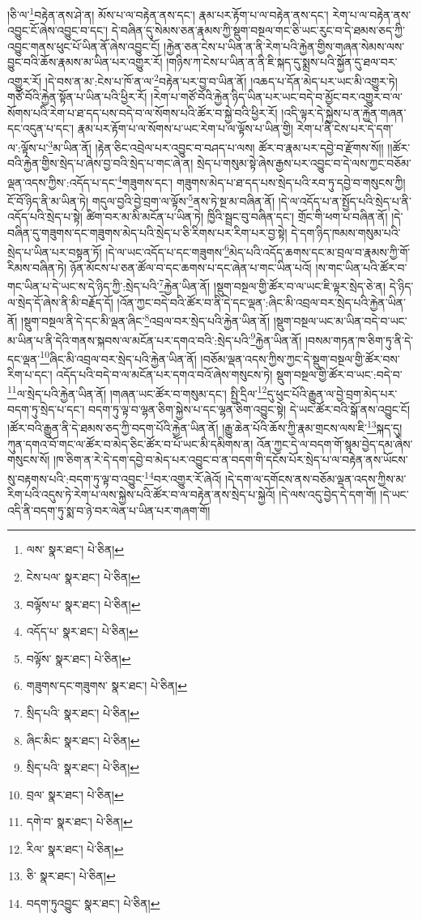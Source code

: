 །ཅི་ལ་\footnote{ལས་  སྣར་ཐང་།  པེ་ཅིན། }བརྟེན་ནས་ཤེ་ན། མོས་པ་ལ་བརྟེན་ནས་དང་། རྣམ་པར་རྟོག་པ་ལ་བརྟེན་ནས་དང་། རེག་པ་ལ་བརྟེན་ནས་འབྱུང་ངོ་ཞེས་འབྱུང་བ་དང་། དེ་བཞིན་དུ་སེམས་ཅན་རྣམས་ཀྱི་སྡུག་བསྔལ་གང་ཅི་ཡང་རུང་བ་དེ་ཐམས་ཅད་ཀྱི་འབྱུང་གནས་ཕུང་པོ་ཡིན་ནོ་ཞེས་འབྱུང་ངོ། །རྐྱེན་ཅན་ངེས་པ་ཡིན་ན་ནི་རེག་པའི་རྐྱེན་གྱིས་གཞན་སེམས་ལས་བྱུང་བའི་ཆོས་རྣམས་མ་ཡིན་པར་འགྱུར་རོ། །གཉིས་ཀ་ངེས་པ་ཡིན་ན་ནི་ཇི་སྐད་དུ་སྨྲས་པའི་སྐྱོན་དུ་ཐལ་བར་འགྱུར་རོ། །དེ་བས་ན་མ་:ངེས་པ་ཁོ་ན་ལ་\footnote{ངེས་པལ་  སྣར་ཐང་།  པེ་ཅིན། }བརྟེན་པར་བྱ་བ་ཡིན་ནོ། །འཆད་པ་དོན་མེད་པར་ཡང་མི་འགྱུར་ཏེ། གཙོ་བོའི་རྐྱེན་སྟོན་པ་ཡིན་པའི་ཕྱིར་རོ། །རེག་པ་གཙོ་བོའི་རྐྱེན་ཉིད་ཡིན་པར་ཡང་བདེ་བ་མྱོང་བར་འགྱུར་བ་ལ་སོགས་པའི་རེག་པ་ཐ་དད་པས་བདེ་བ་ལ་སོགས་པའི་ཚོར་བ་སྐྱེ་བའི་ཕྱིར་རོ། །འདི་ལྟར་དེ་སྐྱེས་པ་ན་རྐྱེན་གཞན་དང་འདུན་པ་དང་། རྣམ་པར་རྟོག་པ་ལ་སོགས་པ་ཡང་རེག་པ་ལ་ལྟོས་པ་ཡིན་གྱི། རེག་པ་ནི་ངེས་པར་དེ་དག་ལ་:ལྟོས་པ་\footnote{བལྟོས་པ་  སྣར་ཐང་།  པེ་ཅིན། }མ་ཡིན་ནོ། །རྟེན་ཅིང་འབྲེལ་པར་འབྱུང་བ་བཤད་པ་ལས། ཚོར་བ་རྣམ་པར་དབྱེ་བ་རྫོགས་སོ།། །།ཚོར་བའི་རྐྱེན་གྱིས་སྲེད་པ་ཞེས་བྱ་བའི་སྲེད་པ་གང་ཞེ་ན། སྲེད་པ་གསུམ་སྟེ་ཞེས་རྒྱས་པར་འབྱུང་བ་དེ་ལས་ཀྱང་བཅོམ་ལྡན་འདས་ཀྱིས་:འདོད་པ་དང་\footnote{འདོད་པ་  སྣར་ཐང་།  པེ་ཅིན། }གཟུགས་དང་། གཟུགས་མེད་པ་ཐ་དད་པས་སྲེད་པའི་རབ་ཏུ་དབྱེ་བ་གསུངས་ཀྱི། ངོ་བོ་ཉིད་ནི་མ་ཡིན་ཏེ། གདུལ་བྱའི་བྱེ་བྲག་ལ་ལྟོས་\footnote{བལྟོས་  སྣར་ཐང་།  པེ་ཅིན། }ནས་ཏེ་སྔ་མ་བཞིན་ནོ། །དེ་ལ་འདོད་པ་ན་སྤྱོད་པའི་སྲེད་པ་ནི་འདོད་པའི་སྲེད་པ་སྟེ། ཚིག་བར་མ་མི་མངོན་པ་ཡིན་ཏེ། ཁྱིའི་སྦྲང་བུ་བཞིན་དང་། གྲོང་གི་ཕག་པ་བཞིན་ནོ། །དེ་བཞིན་དུ་གཟུགས་དང་གཟུགས་མེད་པའི་སྲེད་པ་ཅི་རིགས་པར་རིག་པར་བྱ་སྟེ། དེ་དག་ཉིད་ཁམས་གསུམ་པའི་སྲེད་པ་ཡིན་པར་བསྟན་ཏོ། །དེ་ལ་ཡང་འདོད་པ་དང་གཟུགས་\footnote{གཟུགས་དང་གཟུགས་  སྣར་ཐང་།  པེ་ཅིན། }མེད་པའི་འདོད་ཆགས་དང་མ་བྲལ་བ་རྣམས་ཀྱི་གོ་རིམས་བཞིན་ཏེ། ཉོན་མོངས་པ་ཅན་ཚོལ་བ་དང་ཆགས་པ་དང་ཞེན་པ་གང་ཡིན་པའོ། །ས་གང་ཡིན་པའི་ཚོར་བ་གང་ཡིན་པ་དེ་ཡང་ས་དེ་ཉིད་ཀྱི་:སྲེད་པའི་\footnote{སྲིད་པའི་  སྣར་ཐང་།  པེ་ཅིན། }རྐྱེན་ཡིན་ནོ། །སྡུག་བསྔལ་གྱི་ཚོར་བ་ལ་ཡང་ཇི་ལྟར་སྲེད་ཅེ་ན། དེ་ཉིད་ལ་སྲེད་དོ་ཞེས་ནི་མི་བརྗོད་དོ། །འོན་ཀྱང་བདེ་བའི་ཚོར་བ་ནི་དེ་དང་ལྡན་:ཞིང་མི་འབྲལ་བར་སྲེད་པའི་རྐྱེན་ཡིན་ནོ། །སྡུག་བསྔལ་ནི་དེ་དང་མི་ལྡན་ཞིང་\footnote{ཞིང་མིང་  སྣར་ཐང་།  པེ་ཅིན། }འབྲལ་བར་སྲེད་པའི་རྐྱེན་ཡིན་ནོ། །སྡུག་བསྔལ་ཡང་མ་ཡིན་བདེ་བ་ཡང་མ་ཡིན་པ་ནི་དེའི་གནས་སྐབས་ལ་མངོན་པར་དགའ་བའི་:སྲེད་པའི་\footnote{སྲིད་པའི་  སྣར་ཐང་།  པེ་ཅིན། }རྐྱེན་ཡིན་ནོ། །བསམ་གཏན་ཁ་ཅིག་ཏུ་ནི་དེ་དང་ལྡན་\footnote{བྲལ་  སྣར་ཐང་།  པེ་ཅིན། }ཞིང་མི་འབྲལ་བར་སྲེད་པའི་རྐྱེན་ཡིན་ནོ། །བཅོམ་ལྡན་འདས་ཀྱིས་ཀྱང་དེ་སྡུག་བསྔལ་གྱི་ཚོར་བས་རིག་པ་དང་། འདོད་པའི་བདེ་བ་ལ་མངོན་པར་དགའ་བའོ་ཞེས་གསུངས་ཏེ། སྡུག་བསྔལ་གྱི་ཚོར་བ་ཡང་:བདེ་བ་\footnote{དགེ་བ་  སྣར་ཐང་།  པེ་ཅིན། }ལ་སྲེད་པའི་རྐྱེན་ཡིན་ནོ། །གཞན་ཡང་ཚོར་བ་གསུམ་དང་། སྤྱི་དྲིལ་\footnote{རིལ་  སྣར་ཐང་།  པེ་ཅིན། }དུ་ཕུང་པོའི་རྒྱུན་ལ་བྱེ་བྲག་མེད་པར་བདག་ཏུ་སྲེད་པ་དང་། བདག་ཏུ་ལྟ་བ་ལྷན་ཅིག་སྐྱེས་པ་དང་ལྷན་ཅིག་འབྱུང་སྟེ། དེ་ཡང་ཚོར་བའི་སྒོ་ནས་འབྱུང་ངོ། །ཚོར་བའི་རྒྱུན་ནི་དེ་ཐམས་ཅད་ཀྱི་བདག་པོའི་རྐྱེན་ཡིན་ནོ། །རྒྱུ་ཆེན་པོའི་ཆོས་ཀྱི་རྣམ་གྲངས་ལས་ཇི་\footnote{ཅི་  སྣར་ཐང་།  པེ་ཅིན། }སྐད་དུ། ཀུན་དགའ་བོ་གང་ལ་ཚོར་བ་མེད་ཅིང་ཚོར་བ་པོ་ཡང་མི་དམིགས་ན། འོན་ཀྱང་དེ་ལ་བདག་གོ་སྙམ་བྱེད་དམ་ཞེས་གསུངས་སོ། །ཁ་ཅིག་ན་རེ་དེ་དག་དབྱེ་བ་མེད་པར་འབྱུང་བ་ན་བདག་གི་དངོས་པོར་སྲེད་པ་ལ་བརྟེན་ནས་ཡོངས་སུ་བརྟགས་པའི་:བདག་ཏུ་ལྟ་བ་འབྱུང་\footnote{བདག་ཏུའབྱུང་  སྣར་ཐང་།  པེ་ཅིན། }བར་འགྱུར་རོ་ཞེའོ། །དེ་དག་ལ་དགོངས་ནས་བཅོམ་ལྡན་འདས་ཀྱིས་མ་རིག་པའི་འདུས་ཏེ་རེག་པ་ལས་སྐྱེས་པའི་ཚོར་བ་ལ་བརྟེན་ནས་སྲེད་པ་སྐྱེའོ། །དེ་ལས་འདུ་བྱེད་དེ་དག་གོ། །དེ་ཡང་འདི་ནི་བདག་ཏུ་སྨ་བ་ཉེ་བར་ལེན་པ་ཡིན་པར་གཞག་གོ། 